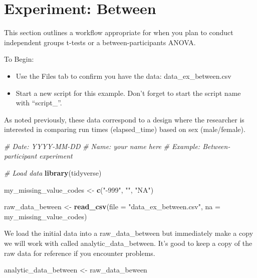 \documentclass[
]{krantz}
\makeatletter
\newenvironment{Shaded}{\begin{snugshade}}{\end{snugshade}}
\newcommand{\CommentTok}[1]{\textcolor[rgb]{0.37,0.37,0.37}{\textit{#1}}}
\newcommand{\DataTypeTok}[1]{\textcolor[rgb]{0.27,0.27,0.27}{#1}}
\newcommand{\KeywordTok}[1]{\textcolor[rgb]{0.27,0.27,0.27}{\textbf{#1}}}
\newcommand{\NormalTok}[1]{#1}
\newcommand{\StringTok}[1]{\textcolor[rgb]{0.5,0.5,0.5}{#1}}
\newenvironment{kframe}{%
\medskip{}
\setlength{\fboxsep}{.8em}
 \def\at@end@of@kframe{}%
 \ifinner\ifhmode%
  \def\at@end@of@kframe{\end{minipage}}%
  \begin{minipage}{\columnwidth}%
 \fi\fi%
 \def\FrameCommand##1{\hskip\@totalleftmargin \hskip-\fboxsep
 \colorbox{shadecolor}{##1}\hskip-\fboxsep
     \hskip-\linewidth \hskip-\@totalleftmargin \hskip\columnwidth}%
 \MakeFramed {\advance\hsize-\width
   \@totalleftmargin\z@ \linewidth\hsize
   \@setminipage}}%
 {\par\unskip\endMakeFramed%
 \at@end@of@kframe}
\renewenvironment{Shaded}{\begin{kframe}}{\end{kframe}}
\makeatother
\begin{document}
\hypertarget{experiment-between}{%
\section{Experiment: Between}\label{experiment-between}}

This section outlines a workflow appropriate for when you plan to conduct independent groups t-tests or a between-participants ANOVA.

To Begin:

\begin{itemize}
\item
  Use the Files tab to confirm you have the data: data\_ex\_between.csv
\item
  Start a new script for this example. Don't forget to start the script name with ``script\_''.
\end{itemize}

As noted previously, these data correspond to a design where the researcher is interested in comparing run times (elapsed\_time) based on sex (male/female).

\begin{Shaded}
\begin{Highlighting}[]
\CommentTok{# Date: YYYY-MM-DD}
\CommentTok{# Name: your name here}
\CommentTok{# Example: Between-participant experiment}

\CommentTok{# Load data}
\KeywordTok{library}\NormalTok{(tidyverse)}

\NormalTok{my_missing_value_codes <-}\StringTok{ }\KeywordTok{c}\NormalTok{(}\StringTok{"-999"}\NormalTok{, }\StringTok{""}\NormalTok{, }\StringTok{"NA"}\NormalTok{)}

\NormalTok{raw_data_beween <-}\StringTok{ }\KeywordTok{read_csv}\NormalTok{(}\DataTypeTok{file =} \StringTok{"data_ex_between.csv"}\NormalTok{,}
                     \DataTypeTok{na =}\NormalTok{ my_missing_value_codes)}
\end{Highlighting}
\end{Shaded}

We load the initial data into a raw\_data\_between but immediately make a copy we will work with called analytic\_data\_between. It's good to keep a copy of the raw data for reference if you encounter problems.

\begin{Shaded}
\begin{Highlighting}[]
\NormalTok{analytic_data_between <-}\StringTok{ }\NormalTok{raw_data_beween}
\end{Highlighting}
\end{Shaded}
\end{document}
